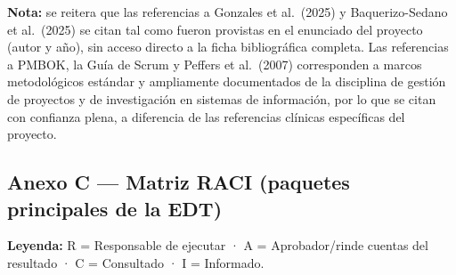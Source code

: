 \documentclass[11pt,a4paper]{article}
\begin{document}
\textbf{Nota:} se reitera que las referencias a Gonzales et al.~(2025) y Baquerizo-Sedano et al.~(2025) se citan tal como fueron provistas en el enunciado del proyecto (autor y año), sin acceso directo a la ficha bibliográfica completa. Las referencias a PMBOK, la Guía de Scrum y Peffers et al.~(2007) corresponden a marcos metodológicos estándar y ampliamente documentados de la disciplina de gestión de proyectos y de investigación en sistemas de información, por lo que se citan con confianza plena, a diferencia de las referencias clínicas específicas del proyecto.

\subsection{Anexo C --- Matriz RACI (paquetes principales de la EDT)}\label{anexo-c-matriz-raci-paquetes-principales-de-la-edt}

\textbf{Leyenda:} R = Responsable de ejecutar · A = Aprobador/rinde cuentas del resultado · C = Consultado · I = Informado.
\end{document}
